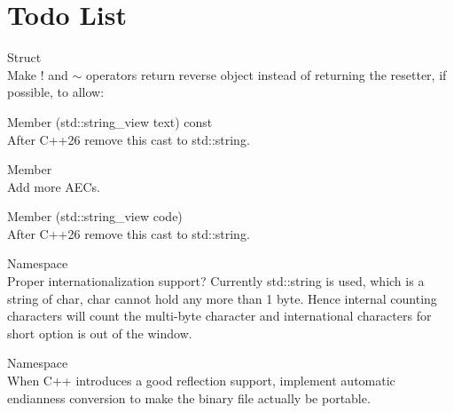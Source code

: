 \chapter{Todo List}
\hypertarget{todo}{}\label{todo}

\begin{DoxyRefList}
\item[Struct \doxylink{structauspicious__library_1_1aec_1_1aec__t}{auspicious\+\_\+library\+::aec\+::aec\+\_\+t} ]\hfill \\
\label{todo__todo000002}%
%
Make ! and \texorpdfstring{$\sim$}{\string~} operators return reverse object instead of returning the resetter, if possible, to allow\+:  
\item[Member \doxylink{structauspicious__library_1_1aec_1_1aec__t_ac7c8650fe2525de9bbeea55c478b74a9}{auspicious\+\_\+library\+::aec\+::aec\+\_\+t\+::operator()} (std\+::string\+\_\+view text) const]\hfill \\
\label{todo__todo000004}%
%
After C++26 remove this cast to std\+::string.  
\item[Member \doxylink{namespaceauspicious__library_1_1aec_af8881b9d6d857581a4e1c5f7b482d715}{auspicious\+\_\+library\+::aec\+::reset} ]\hfill \\
\label{todo__todo000003}%
%
Add more AECs.  
\item[Member \doxylink{namespaceauspicious__library_1_1aec_aa1ee086ed35c793b0ca65b04e20eddf6}{auspicious\+\_\+library\+::aec\+::sgr} (std\+::string\+\_\+view code)]\hfill \\
\label{todo__todo000001}%
%
After C++26 remove this cast to std\+::string.  
\item[Namespace \doxylink{namespaceauspicious__library_1_1ap}{auspicious\+\_\+library\+::ap} ]\hfill \\
\label{todo__todo000005}%
%
Proper internationalization support? Currently std\+::string is used, which is a string of char, char cannot hold any more than 1 byte. Hence internal counting characters will count the multi-\/byte character and international characters for short option is out of the window.  
\item[Namespace \doxylink{namespaceauspicious__library_1_1fu}{auspicious\+\_\+library\+::fu} ]\hfill \\
\label{todo__todo000007}%
%
When C++ introduces a good reflection support, implement automatic endianness conversion to make the binary file actually be portable.


\end{DoxyRefList}
